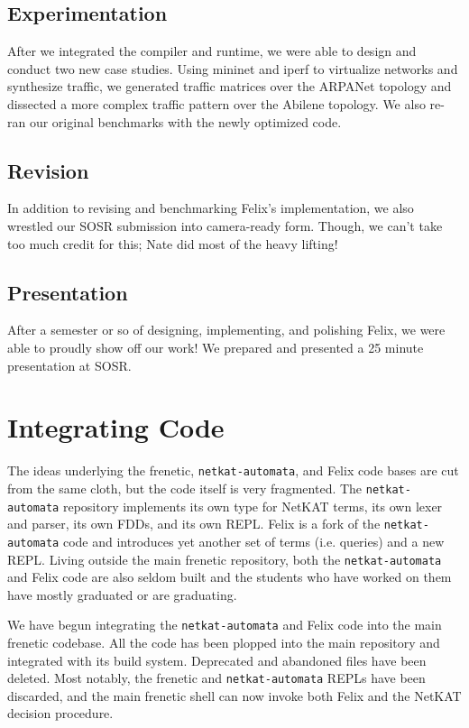 \documentclass{hw}
\newcommand{\netauto}{\texttt{netkat-automata}}
\begin{document}
\subsection{Experimentation}
After we integrated the compiler and runtime, we were able to design and
conduct two new case studies. Using mininet and iperf to virtualize networks
and synthesize traffic, we generated traffic matrices over the ARPANet topology
and dissected a more complex traffic pattern over the Abilene topology. We also
re-ran our original benchmarks with the newly optimized code.

\subsection{Revision}
In addition to revising and benchmarking Felix's implementation, we also
wrestled our SOSR submission into camera-ready form. Though, we can't take too
much credit for this; Nate did most of the heavy lifting!

\subsection{Presentation}
After a semester or so of designing, implementing, and polishing Felix, we were
able to proudly show off our work! We prepared and presented a 25 minute
presentation at SOSR.

\section{Integrating Code}
The ideas underlying the frenetic, \netauto{}, and Felix code bases are cut
from the same cloth, but the code itself is very fragmented. The \netauto{}
repository implements its own type for NetKAT terms, its own lexer and parser,
its own FDDs, and its own REPL. Felix is a fork of the \netauto{} code and
introduces yet another set of terms (i.e. queries) and a new REPL. Living
outside the main frenetic repository, both the \netauto{} and Felix code are
also seldom built and the students who have worked on them have mostly
graduated or are graduating.

We have begun integrating the \netauto{} and Felix code into the main frenetic
codebase. All the code has been plopped into the main repository and integrated
with its build system. Deprecated and abandoned files have been deleted. Most
notably, the frenetic and \netauto{} REPLs have been discarded, and the main
frenetic shell can now invoke both Felix and the NetKAT decision procedure.
\end{document}
